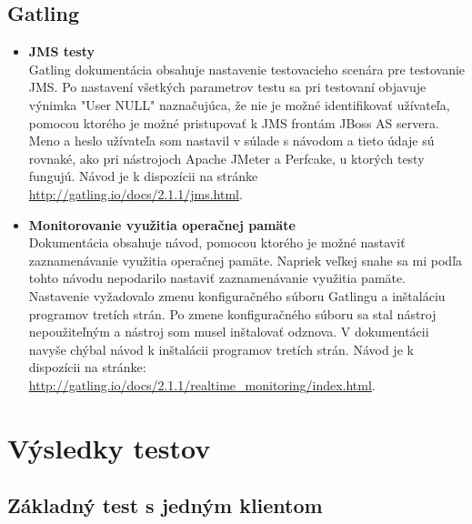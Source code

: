 \documentclass[12pt,oneside,final]{fithesis-utf8}
\begin{document}
\subsection{Gatling}

\begin{itemize}

\item \textbf{JMS testy}\\
Gatling dokumentácia obsahuje nastavenie testovacieho scenára pre testovanie JMS. Po nastavení všetkých parametrov testu sa pri testovaní objavuje výnimka "{}User NULL"{} naznačujúca, že nie je možné identifikovať užívateľa, pomocou ktorého je možné pristupovať k JMS frontám JBoss AS servera. Meno a heslo užívateľa som nastavil v súlade s návodom a tieto údaje sú rovnaké, ako pri nástrojoch Apache JMeter a Perfcake, u ktorých testy fungujú. Návod je k dispozícii na stránke \url{http://gatling.io/docs/2.1.1/jms.html}.

\item \textbf{Monitorovanie využitia operačnej pamäte}\\
Dokumentácia obsahuje návod, pomocou ktorého je možné nastaviť zaznamenávanie využitia operačnej pamäte. Napriek veľkej snahe sa mi podľa tohto návodu nepodarilo nastaviť zaznamenávanie využitia pamäte. Nastavenie vyžadovalo zmenu konfiguračného súboru Gatlingu a inštaláciu programov tretích strán. Po zmene konfiguračného súboru sa stal nástroj nepoužiteľným a nástroj som musel inštalovať odznova. V dokumentácii navyše chýbal návod k inštalácii programov tretích strán. Návod je k dispozícii na stránke: \url{http://gatling.io/docs/2.1.1/realtime_monitoring/index.html}.

\end{itemize}

\section{Výsledky testov}

\subsection{Základný test s jedným klientom}
\end{document}
